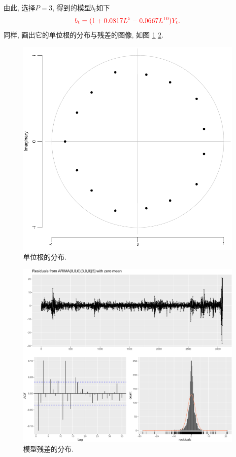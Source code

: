\documentclass[11pt]{article}
\begin{document}
由此, 选择$P=3$, 得到的模型$b_t$如下
\[
    \textcolor{red}{b_t=(1+0.0817L^5-0.0667L^{10})Y_t.  }
\]
同样, 画出它的单位根的分布与残差的图像, 如图 \ref{fig:8} \ref{fig:9}.
\begin{center}
    \hspace{30pt}\begin{minipage}{0.45\textwidth}
        \begin{figure}
            \centering
            \hspace{-30pt}\includegraphics[width=.9\textwidth]{m2}
            \caption{单位根的分布.\label{fig:8}}
        \end{figure}
    \end{minipage}
    \begin{minipage}{0.45\textwidth}
        \begin{figure}
            \centering
            \hspace{-25pt}\includegraphics[width=.9\textwidth]{m21}
            \caption{模型残差的分布.\label{fig:9}}
        \end{figure}
    \end{minipage}
\end{center}
    
\end{document}
